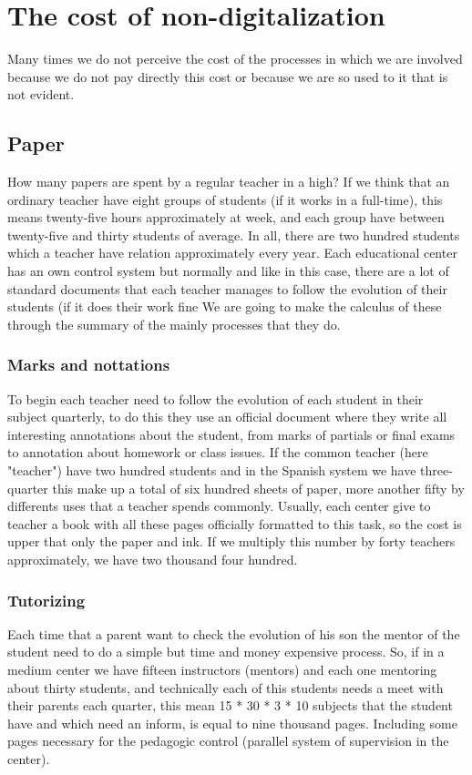 \section{The cost of non-digitalization}

Many times we do not perceive the cost of the processes in which we are involved
because we do not pay directly this cost or because we are so used to it that is
not evident.

\subsection{Paper}
How many papers are spent by a regular teacher in a high?
\intro
If we think that an ordinary teacher have eight groups of students (if it works in a
full-time), this means twenty-five hours approximately at week, and each group have
between twenty-five and thirty students of average. In all, there are two hundred students which a teacher have
relation approximately every year.
\intro
Each educational center has an own control system but normally and like in this case,
there are a lot of standard documents that each teacher manages to follow
the evolution of their students (if it does their work fine
\intro
We are going to make the calculus of these through the summary of the mainly
processes that they do.

\subsubsection{Marks and nottations}

To begin each teacher need to follow the evolution of each student in their
subject quarterly, to do this they use an official document where they write
all interesting annotations about the student, from marks of partials or final
exams to annotation about homework or class issues.
\intro
If the common teacher (here "teacher") have two hundred students and in the Spanish
system we have three-quarter this make up a total of six hundred sheets of paper,
more another fifty by differents uses that a teacher spends commonly.
Usually, each center give to teacher a book with all these pages officially
formatted to this task, so the cost is upper that only the paper and ink.
If we multiply this number by forty teachers approximately, we have
two thousand four hundred.

\subsubsection{Tutorizing}
Each time that a parent want to check the evolution of his son the mentor
of the student need to do a simple but time and money expensive process.
\intro
So, if in a medium center we have fifteen instructors (mentors) and each one mentoring about
thirty students, and technically each of this students needs a meet with their
parents each quarter, this mean 15 * 30 * 3 * 10 subjects that the student have
 and which need an inform, is equal to nine thousand pages.
Including some pages necessary for the pedagogic control (parallel system of
supervision in the center).

